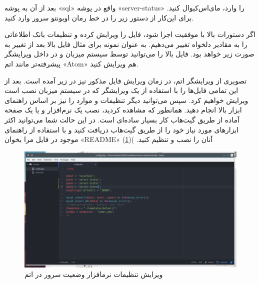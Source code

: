 \begin{latin}  
    
\end{latin}

بعد از آن به پوشه «sql» واقع در پوشه «server-status» را وارد، مای‌اس‌کیوال کنید. برای این‌کار از دستور زیر را در خط رمان اوبونتو سرور وارد کنید.
\newline

\begin{latin}  
    
\end{latin}

اگر دستورات بالا با موفقیت اجرا شود، فایل 
 را ویرایش کرده و تنظیمات بانک اطلاعاتی را به مقادیر دلخواه تغییر می‌دهیم. به عنوان نمونه برای مثال فایل بالا بعد از تغییر به صورت زیر خواهد بود. فایل بالا را می‌توانید توسط سیستم میزبان و در داخل ویرایشگر پیشرفته‌تر مانند اتم «Atom» هم ویرایش کنید.
\newline

\begin{latin}  
    
\end{latin}

تصویری از ویرایشگر اتم، در زمان ویرایش فایل مذکور نیز در زیر آمده است. بعد از این تمامی فایل‌ها را با استفاده از یک ویرایشگر که در سیستم میزبان نصب است ویرایش خواهیم کرد. سپس می‌توانید دیگر تنظیمات و موارد را نیز بر اساس راهنمای ابزار بالا انجام دهید. همانطور که مشاهده کردید، نصب یک نرم‌افزار و یا یک صفحه آماده از طریق گیت‌هاب کار بسیار ساده‌ای است. در این حالت شما می‌توانید اکثر ابزارهای مورد نیاز خود را از طریق گیت‌هاب دریافت کنید و با استفاده از راهنمای موجود در فایل مرا بخوان «README» آنان را نصب و تنظیم کنید. )(\ref{SERVER-STATUS-ATOM-EDITOR})
\begin{figure}
    \includegraphics[width=.9\textwidth ,height=.60\textwidth]{Pic/SERVER-STATUS-ATOM-EDITOR}
    \caption{ ویرایش تنظیمات نرمافزار وضعیت سرور در اتم
    }
    \label{SERVER-STATUS-ATOM-EDITOR}
\end{figure}

